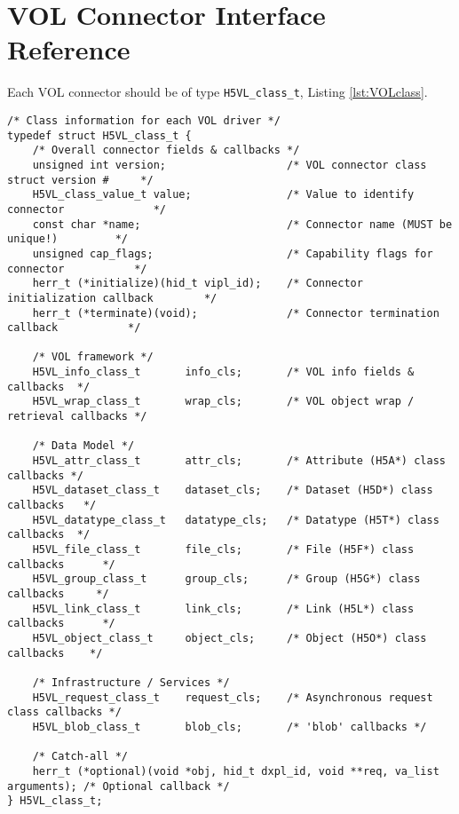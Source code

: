 \section{VOL Connector Interface Reference}
\label{sec:vol}
Each VOL connector should be of type \texttt{H5VL\_class\_t}, Listing \ref{lst:VOLclass}.

\hfill

\begin{lstlisting}[caption={VOL connector class, H5VLpublic.h},captionpos=b, label={lst:VOLclass}]
/* Class information for each VOL driver */
typedef struct H5VL_class_t {
    /* Overall connector fields & callbacks */                                   
    unsigned int version;                   /* VOL connector class struct version #     */
    H5VL_class_value_t value;               /* Value to identify connector              */
    const char *name;                       /* Connector name (MUST be unique!)         */
    unsigned cap_flags;                     /* Capability flags for connector           */
    herr_t (*initialize)(hid_t vipl_id);    /* Connector initialization callback        */
    herr_t (*terminate)(void);              /* Connector termination callback           */
                                                                                 
    /* VOL framework */                                                          
    H5VL_info_class_t       info_cls;       /* VOL info fields & callbacks  */   
    H5VL_wrap_class_t       wrap_cls;       /* VOL object wrap / retrieval callbacks */
                                                                                 
    /* Data Model */                                                             
    H5VL_attr_class_t       attr_cls;       /* Attribute (H5A*) class callbacks */
    H5VL_dataset_class_t    dataset_cls;    /* Dataset (H5D*) class callbacks   */
    H5VL_datatype_class_t   datatype_cls;   /* Datatype (H5T*) class callbacks  */
    H5VL_file_class_t       file_cls;       /* File (H5F*) class callbacks      */
    H5VL_group_class_t      group_cls;      /* Group (H5G*) class callbacks     */
    H5VL_link_class_t       link_cls;       /* Link (H5L*) class callbacks      */
    H5VL_object_class_t     object_cls;     /* Object (H5O*) class callbacks    */
                                                                                 
    /* Infrastructure / Services */                                              
    H5VL_request_class_t    request_cls;    /* Asynchronous request class callbacks */
    H5VL_blob_class_t       blob_cls;       /* 'blob' callbacks */               
                                                                                 
    /* Catch-all */                                                              
    herr_t (*optional)(void *obj, hid_t dxpl_id, void **req, va_list arguments); /* Optional callback */
} H5VL_class_t;
\end{lstlisting}


